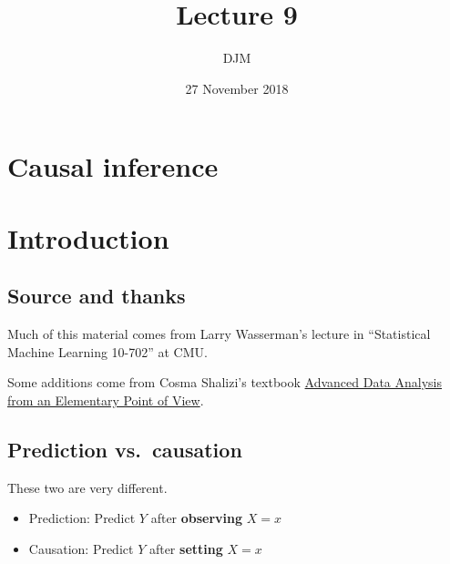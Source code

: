 \documentclass[]{article}
\title{Lecture 9}
\author{DJM}
\date{27 November 2018}
\providecommand{\tightlist}{%
  \setlength{\itemsep}{0pt}\setlength{\parskip}{0pt}}
\begin{document}
\maketitle

\newcommand{\E}{\mathbb{E}}
\newcommand{\Expect}[1]{\mathbb{E}\left[ #1 \right]}
\newcommand{\Var}[1]{\mathbb{V}\left[ #1 \right]}
\newcommand{\Cov}[2]{\mathrm{Cov}\left[#1,\ #2\right]}
\newcommand{\given}{\ \vert\ }
\renewcommand{\P}{\mathbb{P}}
\newcommand{\argmin}{\arg\min}
\newcommand{\argmax}{\arg\max}
\newcommand{\F}{\mathcal{F}}
\newcommand{\norm}[1]{\left\lVert #1 \right\rVert}
\newcommand{\indicator}{\mathbf{1}}
\renewcommand{\bar}{\overline}
\renewcommand{\hat}{\widehat}
\newcommand{\tr}[1]{\mbox{tr}(#1)}
\newcommand{\X}{X}
\newcommand{\R}{\mathbb{R}}
\newcommand{\set}[1]{\texttt{set}(#1)}
\def\indep{\perp\!\!\!\perp}
\def\notindep{\not\!\perp\!\!\!\perp}

\hypertarget{causal-inference}{%
\section{Causal inference}\label{causal-inference}}

\hypertarget{introduction}{%
\section{Introduction}\label{introduction}}

\hypertarget{source-and-thanks}{%
\subsection{Source and thanks}\label{source-and-thanks}}

Much of this material comes from Larry Wasserman's lecture in
``Statistical Machine Learning 10-702'' at CMU.

Some additions come from Cosma Shalizi's textbook
\href{http://www.stat.cmu.edu/~cshalizi/ADAfaEPoV/}{Advanced Data
Analysis from an Elementary Point of View}.

\hypertarget{prediction-vs.causation}{%
\subsection{Prediction vs.~causation}\label{prediction-vs.causation}}

These two are very different.

\begin{itemize}
\tightlist
\item
  Prediction: Predict \(Y\) after \textbf{observing} \(X=x\)
\item
  Causation: Predict \(Y\) after \textbf{setting} \(X=x\)
\end{itemize}
\end{document}
